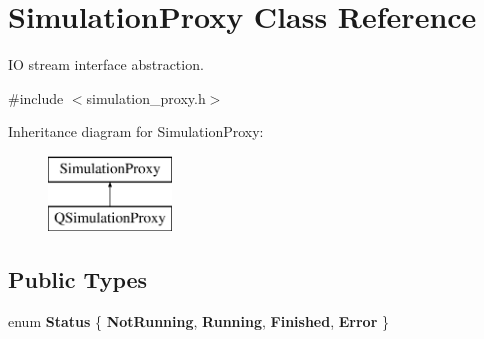 \hypertarget{class_simulation_proxy}{}\section{Simulation\+Proxy Class Reference}
\label{class_simulation_proxy}


IO stream interface abstraction.  




{\ttfamily \#include $<$simulation\+\_\+proxy.\+h$>$}

Inheritance diagram for Simulation\+Proxy\+:\begin{figure}[H]
\begin{center}
\leavevmode
\includegraphics[height=2.000000cm]{class_simulation_proxy}
\end{center}
\end{figure}
\subsection*{Public Types}
\begin{DoxyCompactItemize}
\item 
\mbox{\label{class_simulation_proxy_ab558a4c6e83bfa9c30a7f2829aff1c15}} 
enum {\bfseries Status} \{ {\bfseries Not\+Running}, 
{\bfseries Running}, 
{\bfseries Finished}, 
{\bfseries Error}
 \}
\end{DoxyCompactItemize}
